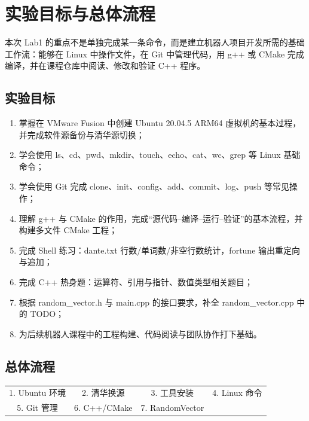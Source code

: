 \documentclass[12pt,a4paper]{ctexart}
\begin{document}
\newpage

\section{实验目标与总体流程}

本次 Lab1 的重点不是单独完成某一条命令，而是建立机器人项目开发所需的基础工作流：能够在 Linux 中操作文件，在 Git 中管理代码，用 g++ 或 CMake 完成编译，并在课程仓库中阅读、修改和验证 C++ 程序。

\subsection{实验目标}
\begin{enumerate}[itemsep=1pt]
\item 掌握在 VMware Fusion 中创建 Ubuntu 20.04.5 ARM64 虚拟机的基本过程，并完成软件源备份与清华源切换；
\item 学会使用 ls、cd、pwd、mkdir、touch、echo、cat、wc、grep 等 Linux 基础命令；
\item 学会使用 Git 完成 clone、init、config、add、commit、log、push 等常见操作；
\item 理解 g++ 与 CMake 的作用，完成``源代码--编译--运行--验证''的基本流程，并构建多文件 CMake 工程；
\item 完成 Shell 练习：dante.txt 行数/单词数/非空行数统计，fortune 输出重定向与追加；
\item 完成 C++ 热身题：运算符、引用与指针、数值类型相关题目；
\item 根据 random\_vector.h 与 main.cpp 的接口要求，补全 random\_vector.cpp 中的 TODO；
\item 为后续机器人课程中的工程构建、代码阅读与团队协作打下基础。
\end{enumerate}

\subsection{总体流程}
\begin{center}
\small
\begin{tabular}{cccc}
\toprule
1. Ubuntu 环境 & 2. 清华换源 & 3. 工具安装 & 4. Linux 命令 \\
5. Git 管理 & 6. C++/CMake & 7. RandomVector & \\
\bottomrule
\end{tabular}
\end{center}
\end{document}
